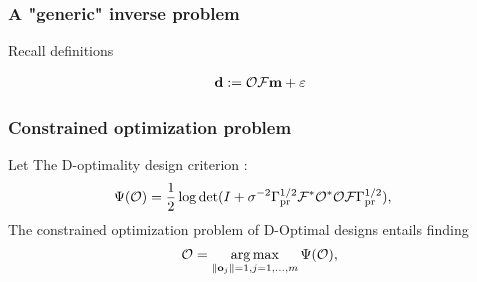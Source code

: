 \documentclass{beamer}
\begin{document}
\begin{frame}
\frametitle{A "generic" inverse problem}
Recall definitions

\begin{align}\label{eq:inverse problem}
    \mathbf{d} := \mathcal{O} \mathcal{F} \mathbf{m} + \varepsilon
\end{align}


\end{frame}

\begin{frame}
\frametitle{Constrained optimization problem}
Let The D-optimality design criterion
\cite{AlexanderianGloorGhattas14}:
\begin{align*}
  \begin{split}
    \tar(\obs) %
    &= \frac12 \log \det ( I + \sigma^{-2} \prcov^{1/2} \fwd ^*
    \obs^* \obs \fwd \prcov^{1/2}), 
  \end{split}
\end{align*}
The constrained optimization problem of D-Optimal designs entails finding
\begin{equation*}
  \mathcal{O} = \operatorname*{arg\,max}_{\|\mathbf{o}_j\| = 1, j=1,\dots,m}\Psi(\mathcal{O}),
\end{equation*}
\end{frame}
\end{document}
